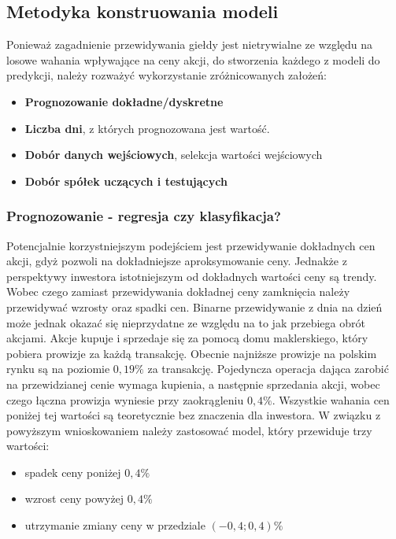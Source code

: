\documentclass[a4paper, twoside, 11pt, openright]{article}
\begin{document}
\subsection{Metodyka konstruowania modeli}

Ponieważ zagadnienie przewidywania giełdy jest nietrywialne ze względu na losowe wahania wpływające na ceny akcji, do stworzenia każdego z modeli do predykcji, należy rozważyć wykorzystanie zróżnicowanych założeń:
	
\begin{itemize}
\item{\textbf{Prognozowanie dokładne/dyskretne} }
\item{\textbf{Liczba dni}, z których prognozowana jest wartość.}
\item{\textbf{Dobór danych wejściowych}, selekcja wartości wejściowych}
\item{\textbf{Dobór spółek uczących i testujących}}
\end{itemize}

\subsubsection{Prognozowanie - regresja czy klasyfikacja?}

Potencjalnie korzystniejszym podejściem jest przewidywanie dokładnych cen akcji, gdyż pozwoli na dokładniejsze aproksymowanie ceny. Jednakże z perspektywy inwestora istotniejszym od dokładnych wartości ceny są trendy. Wobec czego zamiast przewidywania dokładnej ceny zamknięcia należy przewidywać wzrosty oraz spadki cen. Binarne przewidywanie z dnia na dzień może jednak okazać się nieprzydatne ze względu na to jak przebiega obrót akcjami. Akcje kupuje i sprzedaje się za pomocą domu maklerskiego, który pobiera prowizje za każdą transakcję. Obecnie najniższe prowizje na polskim rynku są na poziomie $0,19\%$ za transakcję. Pojedyncza operacja dająca zarobić na przewidzianej cenie wymaga kupienia, a następnie sprzedania akcji, wobec czego łączna prowizja wyniesie przy zaokrągleniu $0,4\%$. Wszystkie wahania cen poniżej tej wartości są teoretycznie bez znaczenia dla inwestora. W związku z powyższym wnioskowaniem należy zastosować model, który przewiduje trzy wartości:
\begin{itemize}
\item spadek ceny poniżej $0,4\%$
\item wzrost ceny powyżej $0,4\%$
\item utrzymanie zmiany ceny w przedziale $(-0,4; 0,4)\%$
\end{itemize}
\end{document}
